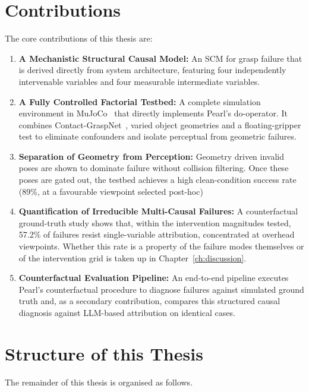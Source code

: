 \documentclass[11pt,a4paper]{report}
\begin{document}
\section{Contributions}
\label{sec:contributions}

The core contributions of this thesis are:

\begin{enumerate}
    \item \textbf{A Mechanistic Structural Causal Model:} An SCM for grasp failure that is derived directly from system architecture, featuring four independently intervenable variables and four measurable intermediate variables.
    \item \textbf{A Fully Controlled Factorial Testbed:} A complete simulation environment in MuJoCo~\cite{todorov2012mujoco} that directly implements Pearl's do-operator. It combines Contact-GraspNet~\cite{sundermeyer2021contactgraspnet}, varied object geometries and a floating-gripper test to eliminate confounders and isolate perceptual from geometric failures.
    \item \textbf{Separation of Geometry from Perception:} Geometry driven invalid poses are shown to dominate failure without collision filtering. Once these poses are gated out, the testbed achieves a high clean-condition success rate (89\%, at a favourable viewpoint selected post-hoc)
    \item \textbf{Quantification of Irreducible Multi-Causal Failures:} A counterfactual ground-truth study shows that, within the intervention magnitudes tested, 57.2\% of failures resist single-variable attribution, concentrated at overhead viewpoints. Whether this rate is a property of the failure modes themselves or of the intervention grid is taken up in Chapter~\ref{ch:discussion}.
    \item \textbf{Counterfactual Evaluation Pipeline:} An end-to-end pipeline executes Pearl's counterfactual procedure to diagnose failures against simulated ground truth and, as a secondary contribution, compares this structured causal diagnosis against LLM-based attribution on identical cases.
\end{enumerate}

\section{Structure of this Thesis}
\label{sec:organisation}

The remainder of this thesis is organised as follows.
\end{document}
